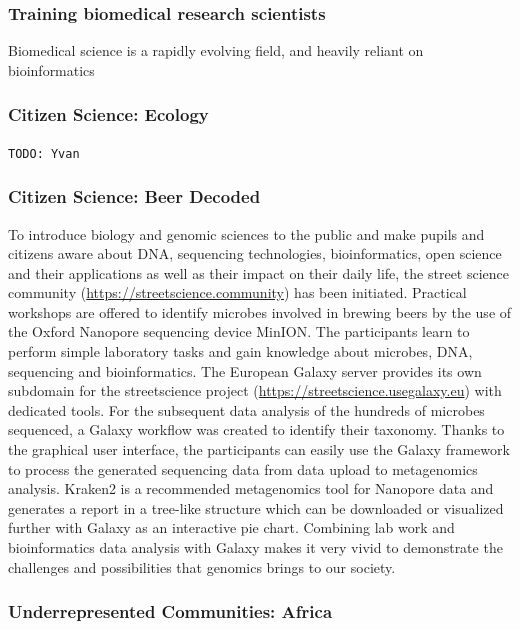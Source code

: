 \documentclass[10pt,letterpaper]{article}
\begin{document}
\subsubsection*{Training biomedical research scientists}
Biomedical science is a rapidly evolving field, and heavily reliant on bioinformatics

\subsubsection*{Citizen Science: Ecology}

\verb+TODO: Yvan+

\subsubsection*{Citizen Science: Beer Decoded}

To introduce biology and genomic sciences to the public and make pupils and citizens aware about DNA, sequencing technologies, bioinformatics, open science and their applications as well as their impact on their daily life, the street science community (\url{https://streetscience.community}) has been initiated.
Practical workshops are offered to identify microbes involved in brewing beers by the use of the Oxford Nanopore sequencing device MinION\@.
The participants learn to perform simple laboratory tasks and gain knowledge about microbes, DNA, sequencing and bioinformatics.
The European Galaxy server provides its own subdomain for the streetscience project (\url{https://streetscience.usegalaxy.eu}) with dedicated tools.
For the subsequent data analysis of the hundreds of microbes sequenced, a Galaxy workflow was created to identify their taxonomy.
Thanks to the graphical user interface, the participants can easily use the Galaxy framework to process the generated sequencing data from data upload to  metagenomics analysis.
Kraken2 \cite{wood2019improved} is a recommended metagenomics tool for Nanopore data and generates a report in a tree-like structure which can be downloaded or visualized further with Galaxy as an interactive pie chart.
Combining lab work and bioinformatics data analysis with Galaxy makes it very vivid to demonstrate the challenges and possibilities that genomics brings to our society.


\subsubsection*{Underrepresented Communities: Africa}
\end{document}
